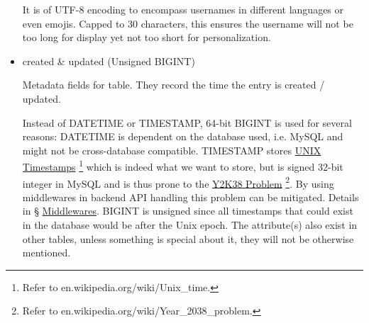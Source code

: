 \documentclass[12pt]{report}
\newcommand{\n}{\par}
\begin{document}
\begin{itemize}
	      It is of UTF-8 encoding to encompass usernames in different languages or even emojis.
	      Capped to 30 characters, this ensures the username will not be too long for display yet not too short for personalization.
	\item created \& updated (Unsigned BIGINT)\n
	      Metadata fields for table. They record the time the entry is created / updated.\n
	      Instead of DATETIME or TIMESTAMP, 64-bit BIGINT is used for several reasons:
	      DATETIME is dependent on the database used, i.e. MySQL and might not be cross-database compatible.
	      TIMESTAMP stores \href{https://en.wikipedia.org/wiki/Unix_time}{UNIX Timestamps}
	      \footnote{Refer to en.wikipedia.org/wiki/Unix\_time.}
	      which is indeed what we want to store,
	      but is signed 32-bit integer in MySQL and is thus prone to the
	      \href{https://en.wikipedia.org/wiki/Year_2038_problem}{Y2K38 Problem}
	      \footnote{Refer to en.wikipedia.org/wiki/Year\_2038\_problem.}.
	      By using middlewares in backend API handling this problem can be mitigated.
	      Details in \S{} \hyperref[application-layer.design.middlewares]{Middlewares}.
	      BIGINT is unsigned since all timestamps that could exist in the database would be after the Unix epoch.
	      The attribute(s) also exist in other tables, unless something is special about it, they will not be otherwise mentioned.
\end{itemize}
\end{document}
